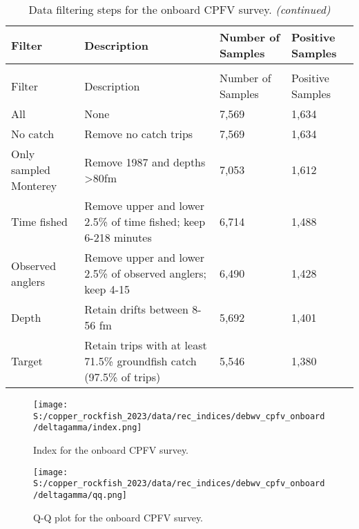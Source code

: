 \documentclass[11pt,
  english,
  letterpaper,
]{article}
\begin{document}
\begin{landscape}\begingroup\fontsize{9}{11}\selectfont

\begin{longtable}[t]{l>{\raggedright\arraybackslash}p{8cm}ll}
\caption{\label{tab:deb-filter}Data filtering steps for the onboard CPFV survey.}\\
\toprule
Filter & Description & Number of Samples & Positive Samples\\
\midrule
\endfirsthead
\caption[]{\label{tab:deb-filter}Data filtering steps for the onboard CPFV survey. \textit{(continued)}}\\
\toprule
Filter & Description & Number of Samples & Positive Samples\\
\midrule
\endhead

\endfoot
\bottomrule
\endlastfoot
All & None & 7,569 & 1,634\\
No catch & Remove no catch trips & 7,569 & 1,634\\
Only sampled Monterey & Remove 1987 and depths >80fm & 7,053 & 1,612\\
Time fished & Remove upper and lower 2.5\% of time fished; keep 6-218 minutes & 6,714 & 1,488\\
Observed anglers & Remove upper and lower 2.5\% of observed anglers; keep 4-15 & 6,490 & 1,428\\
Depth & Retain drifts between 8-56 fm & 5,692 & 1,401\\
Target & Retain trips with at least 71.5\% groundfish catch (97.5\% of trips) & 5,546 & 1,380\\*
\end{longtable}
\endgroup{}
\end{landscape}
\endgroup{}

\newpage

\begin{figure}
\centering
\texttt{[image: S:/copper\_rockfish\_2023/data/rec\_indices/debwv\_cpfv\_onboard/deltagamma/index.png]}
\caption{Index for the onboard CPFV survey.\label{fig:deb-index}}
\end{figure}

\newpage

\begin{figure}
\centering
\texttt{[image: S:/copper\_rockfish\_2023/data/rec\_indices/debwv\_cpfv\_onboard/deltagamma/qq.png]}
\caption{Q-Q plot for the onboard CPFV survey.\label{fig:deb-qq}}
\end{figure}
\end{document}
